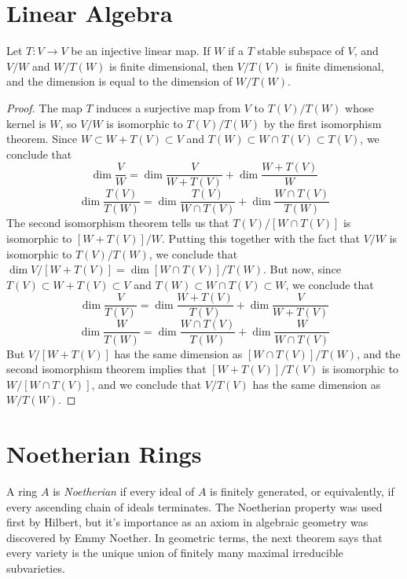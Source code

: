 \chapter{Linear Algebra}

\begin{theorem}
    Let $T:V \to V$ be an injective linear map. If $W$ if a $T$ stable subspace of $V$, and $V/W$ and $W/T(W)$ is finite dimensional, then $V/T(V)$ is finite dimensional, and the dimension is equal to the dimension of $W/T(W)$.
\end{theorem}
\begin{proof}
    The map $T$ induces a surjective map from $V$ to $T(V)/T(W)$ whose kernel is $W$, so $V/W$ is isomorphic to $T(V)/T(W)$ by the first isomorphism theorem. Since $W \subset W + T(V) \subset V$ and $T(W) \subset W \cap T(V) \subset T(V)$, we conclude that
    \[ \dim \frac{V}{W} = \dim \frac{V}{W + T(V)} + \dim \frac{W + T(V)}{W} \]
    \[ \dim \frac{T(V)}{T(W)} = \dim \frac{T(V)}{W \cap T(V)} + \dim \frac{W \cap T(V)}{T(W)} \]
    The second isomorphism theorem tells us that $T(V)/[W \cap T(V)]$ is isomorphic to $[W + T(V)]/W$. Putting this together with the fact that $V/W$ is isomorphic to $T(V)/T(W)$, we conclude that $\dim V/[W + T(V)] = \dim [W \cap T(V)]/T(W)$. But now, since $T(V) \subset W + T(V) \subset V$ and $T(W) \subset W \cap T(V) \subset W$, we conclude that
    \[ \dim \frac{V}{T(V)} = \dim \frac{W + T(V)}{T(V)} + \dim \frac{V}{W + T(V)} \]
    \[ \dim \frac{W}{T(W)} = \dim \frac{W \cap T(V)}{T(W)} + \dim \frac{W}{W \cap T(V)} \]
    But $V/[W + T(V)]$ has the same dimension as $[W \cap T(V)]/T(W)$, and the second isomorphism theorem implies that $[W + T(V)]/T(V)$ is isomorphic to $W/[W \cap T(V)]$, and we conclude that $V/T(V)$ has the same dimension as $W/T(W)$.
\end{proof}




\chapter{Noetherian Rings}

A ring $A$ is \emph{Noetherian} if every ideal of $A$ is finitely generated, or equivalently, if every ascending chain of ideals terminates. The Noetherian property was used first by Hilbert, but it's importance as an axiom in algebraic geometry was discovered by Emmy Noether. In geometric terms, the next theorem says that every variety is the unique union of finitely many maximal irreducible subvarieties.

